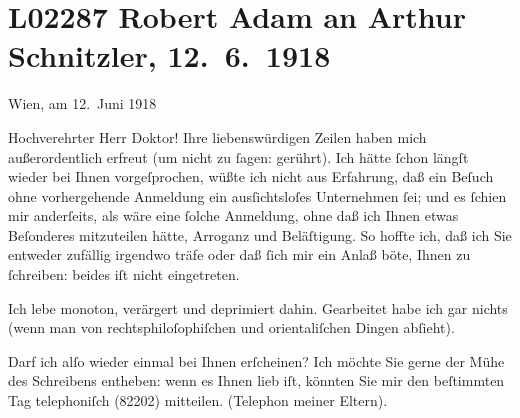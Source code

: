 

\section[Robert Adam an Arthur Schnitzler, 12. 6. 1918]{L02287 Robert Adam an Arthur Schnitzler, 12. 6. 1918}
\nopagebreak{}
\rehead{ }\normalsize\beginnumbering{}
\toendnotes[C]{\smallbreak\pagebreak[2]}
\toendnotes[C]{\smallbreak}
\pstart
           \raggedleft{}{\pb}Wien, am 12. Juni 1918\pend
           
\pstart\center{}Hochverehrter Herr Doktor!\pend\vspace{0.5em}
\pstart
           Ihre liebenswürdigen Zeilen haben mich außerordentlich erfreut (um nicht zu ſagen:
               gerührt). Ich hätte ſchon längſt wieder bei Ihnen vorgeſprochen, wüßte ich nicht aus
               Erfahrung, daß ein Beſuch ohne vorhergehende Anmeldung ein ausſichtsloſes Unternehmen
               ſei; und es ſchien mir anderſeits, als wäre eine ſolche Anmeldung, ohne daß ich Ihnen
               etwas Beſonderes mitzuteilen hätte, Arroganz und Beläſtigung. So hoffte ich, daß ich
               Sie entweder zufällig irgendwo träfe oder daß ſich mir ein Anlaß böte, Ihnen zu
               ſchreiben: beides iſt nicht eingetreten.\pend
           
\pstart
           Ich lebe monoton, verärgert und {\pb}deprimiert dahin. Gearbeitet habe ich gar nichts (wenn man von
               rechtsphiloſophiſchen und orientaliſchen Dingen abſieht).\pend
           
\pstart
           Darf ich alſo wieder einmal bei Ihnen erſcheinen? Ich möchte Sie gerne der Mühe des
               Schreibens entheben: wenn es Ihnen lieb iſt, könnten Sie mir den beſtimmten Tag
               telephoniſch (82202) mitteilen. (Telephon meiner Eltern).\pend
           
